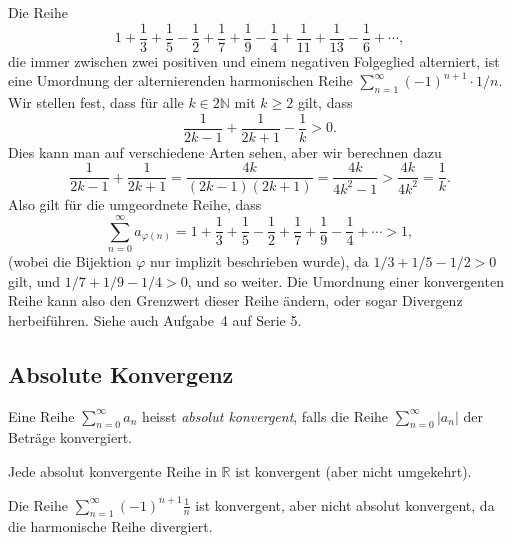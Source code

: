 \documentclass[../main.tex]{subfiles}
\begin{document}
\begin{example}
  Die Reihe
  \[
    1 + \frac{1}{3} + \frac{1}{5} - \frac{1}{2}
    + \frac{1}{7} + \frac{1}{9} - \frac{1}{4}
    + \frac{1}{11} + \frac{1}{13} - \frac{1}{6}
    + \cdots,
  \]
  die immer zwischen zwei positiven und einem
  negativen Folgeglied alterniert,
  ist eine Umordnung der
  alternierenden harmonischen Reihe
  $\sum_{n=1}^{\infty} {(-1)}^{n+1} \cdot 1/n$.
  Wir stellen fest, dass für alle
  $k \in 2 \mathbb{N}$ mit $k \geq 2$ gilt,
  dass
  \[
    \frac{1}{2k-1} + \frac{1}{2k+1} - \frac{1}{k} > 0.
  \]
  Dies kann man auf verschiedene Arten sehen,
  aber wir berechnen dazu
  \[
    \frac{1}{2k-1} + \frac{1}{2k+1} = \frac{4k}{(2k-1)(2k+1)}
    = \frac{4k}{4k^2 - 1} > \frac{4k}{4k^2} = \frac{1}{k}.
  \]
  Also gilt für die umgeordnete Reihe, dass
  \[
    \sum_{n=0}^{\infty} a_{\varphi(n)} = 
    1 + \frac{1}{3} + \frac{1}{5} - \frac{1}{2}
    + \frac{1}{7} + \frac{1}{9} - \frac{1}{4} + \cdots > 1,
  \]
  (wobei die Bijektion $\varphi$ nur implizit
  beschrieben wurde), da
  $1/3 + 1/5 - 1/2 > 0$ gilt, und $1/7 + 1/9 - 1/4 > 0$,
  und so weiter.
  Die Umordnung einer konvergenten Reihe kann also den
  Grenzwert dieser Reihe ändern,
  oder sogar Divergenz herbeiführen. Siehe auch Aufgabe~4
  auf Serie 5.
\end{example}

\subsection*{Absolute Konvergenz}
\begin{definition}
  Eine Reihe $\sum_{n=0}^{\infty} a_n$ heisst
  \emph{absolut konvergent}, falls die Reihe
  $\sum_{n=0}^{\infty} |a_n|$ der Beträge konvergiert.
\end{definition}

\begin{lemma*}
  Jede absolut konvergente Reihe in
  $\mathbb{R}$ ist konvergent (aber nicht umgekehrt).
\end{lemma*}

\begin{example}
  Die Reihe
  $\sum_{n=1}^{\infty} {(-1)}^{n+1}\frac{1}{n}$ 
  ist konvergent, aber
  nicht absolut konvergent, da die harmonische Reihe divergiert.
\end{example}
\end{document}
